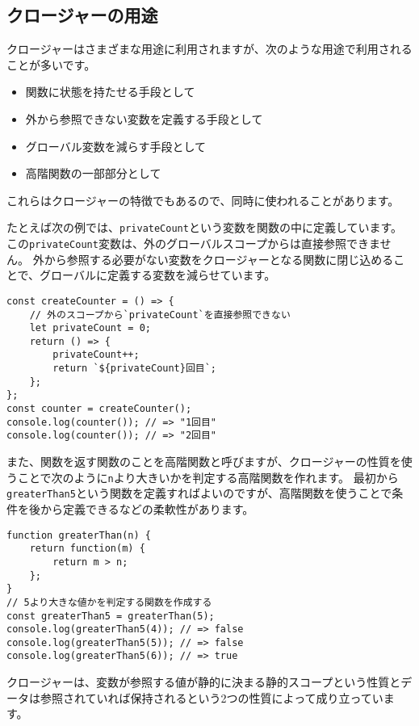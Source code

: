 \hypertarget{closure-usecase}{%
\subsection{クロージャーの用途}\label{closure-usecase}}

クロージャーはさまざまな用途に利用されますが、次のような用途で利用されることが多いです。

\begin{itemize}
\item
  関数に状態を持たせる手段として
\item
  外から参照できない変数を定義する手段として
\item
  グローバル変数を減らす手段として
\item
  高階関数の一部部分として
\end{itemize}

これらはクロージャーの特徴でもあるので、同時に使われることがあります。

たとえば次の例では、\texttt{privateCount}という変数を関数の中に定義しています。
この\texttt{privateCount}変数は、外のグローバルスコープからは直接参照できません。
外から参照する必要がない変数をクロージャーとなる関数に閉じ込めることで、グローバルに定義する変数を減らせています。

\begin{lstlisting}
const createCounter = () => {
    // 外のスコープから`privateCount`を直接参照できない
    let privateCount = 0;
    return () => {
        privateCount++;
        return `${privateCount}回目`;
    };
};
const counter = createCounter();
console.log(counter()); // => "1回目"
console.log(counter()); // => "2回目"
\end{lstlisting}

また、関数を返す関数のことを高階関数と呼びますが、クロージャーの性質を使うことで次のように\texttt{n}より大きいかを判定する高階関数を作れます。
最初から\texttt{greaterThan5}という関数を定義すればよいのですが、高階関数を使うことで条件を後から定義できるなどの柔軟性があります。

\begin{lstlisting}
function greaterThan(n) {
    return function(m) {
        return m > n; 
    };
}
// 5より大きな値かを判定する関数を作成する
const greaterThan5 = greaterThan(5);
console.log(greaterThan5(4)); // => false
console.log(greaterThan5(5)); // => false
console.log(greaterThan5(6)); // => true
\end{lstlisting}

クロージャーは、変数が参照する値が静的に決まる静的スコープという性質とデータは参照されていれば保持されるという2つの性質によって成り立っています。

